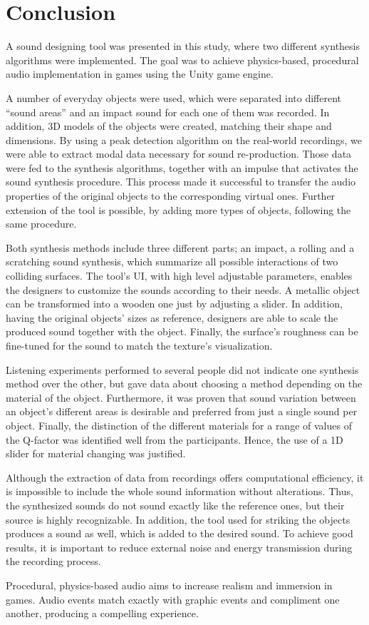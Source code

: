 \chapter{Conclusion}

A sound designing tool was presented in this study, where two different synthesis algorithms were implemented. The goal was to achieve physics-based, procedural audio implementation in games using the Unity\textsuperscript{\textregistered} game engine. 

A number of everyday objects were used, which were separated into different ``sound areas'' and an impact sound for each one of them was recorded. In addition, 3D models of the objects were created, matching their shape and dimensions. By using a peak detection algorithm on the real-world recordings, we were able to extract modal data necessary for sound re-production. Those data were fed to the synthesis algorithms, together with an impulse that activates the sound synthesis procedure. This process made it successful to transfer the audio properties of the original objects to the corresponding virtual ones. Further extension of the tool is possible, by adding more types of objects, following the same procedure.

Both synthesis methods include three different parts; an impact, a rolling and a scratching sound synthesis, which summarize all possible interactions of two colliding surfaces. The tool's \gls{UI}, with high level adjustable parameters, enables the designers to customize the sounds according to their needs. A metallic object can be transformed into a wooden one just by adjusting a slider. In addition, having the original objects' sizes as reference, designers are able to scale the produced sound together with the object. Finally, the surface's roughness can be fine-tuned for the sound to match the texture's visualization.

Listening experiments performed to several people did not indicate one synthesis method over the other, but gave data about choosing a method depending on the material of the object. Furthermore, it was proven that sound variation between an object's different areas is desirable and preferred from just a single sound per object. Finally, the distinction of the different materials for a range of values of the Q-factor was identified well from the participants. Hence, the use of a 1D slider for material changing was justified.

Although the extraction of data from recordings offers computational efficiency, it is impossible to include the whole sound information without alterations. Thus, the synthesized sounds do not sound exactly like the reference ones, but their source is highly recognizable. In addition, the tool used for striking the objects produces a sound as well, which is added to the desired sound. To achieve good results, it is important to reduce external noise and energy transmission during the recording process.

Procedural, physics-based audio aims to increase realism and immersion in games. Audio events match exactly with graphic events and compliment one another, producing a compelling experience.